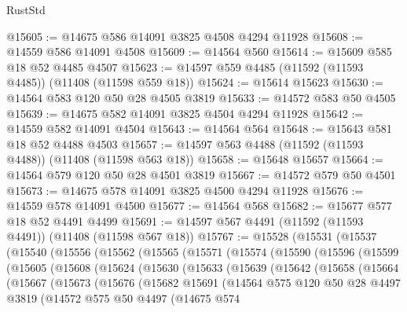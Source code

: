 \begin{lexlean}{RustStd}
\begin{coremodule}
@15605 := @14675 @586 @14091 @3825 @4508 @4294 @11928
@15608 := @14559 @586 @14091 @4508
@15609 := @14564 @560
@15614 := @15609 @585 @18 @52 @4485 @4507
@15623 := @14597 @559 @4485 (@11592 (@11593 @4485)) (@11408 (@11598 @559 @18))
@15624 := @15614 @15623
@15630 := @14564 @583 @120 @50 @28 @4505 @3819
@15633 := @14572 @583 @50 @4505
@15639 := @14675 @582 @14091 @3825 @4504 @4294 @11928
@15642 := @14559 @582 @14091 @4504
@15643 := @14564 @564
@15648 := @15643 @581 @18 @52 @4488 @4503
@15657 := @14597 @563 @4488 (@11592 (@11593 @4488)) (@11408 (@11598 @563 @18))
@15658 := @15648 @15657
@15664 := @14564 @579 @120 @50 @28 @4501 @3819
@15667 := @14572 @579 @50 @4501
@15673 := @14675 @578 @14091 @3825 @4500 @4294 @11928
@15676 := @14559 @578 @14091 @4500
@15677 := @14564 @568
@15682 := @15677 @577 @18 @52 @4491 @4499
@15691 := @14597 @567 @4491 (@11592 (@11593 @4491)) (@11408 (@11598 @567 @18))
@15767 := @15528
    (@15531
      (@15537
        (@15540
          (@15556
            (@15562
              (@15565
                (@15571
                  (@15574
                    (@15590
                      (@15596
                        (@15599
                          (@15605
                            (@15608
                              (@15624
                                (@15630
                                  (@15633
                                    (@15639
                                      (@15642
                                        (@15658
                                          (@15664
                                            (@15667
                                              (@15673
                                                (@15676
                                                  (@15682
                                                    @15691
                                                    (@14564
                                                      @575
                                                      @120
                                                      @50
                                                      @28
                                                      @4497
                                                      @3819
                                                      (@14572
                                                        @575
                                                        @50
                                                        @4497
                                                        (@14675
                                                          @574

\end{coremodule}
\end{lexlean}
